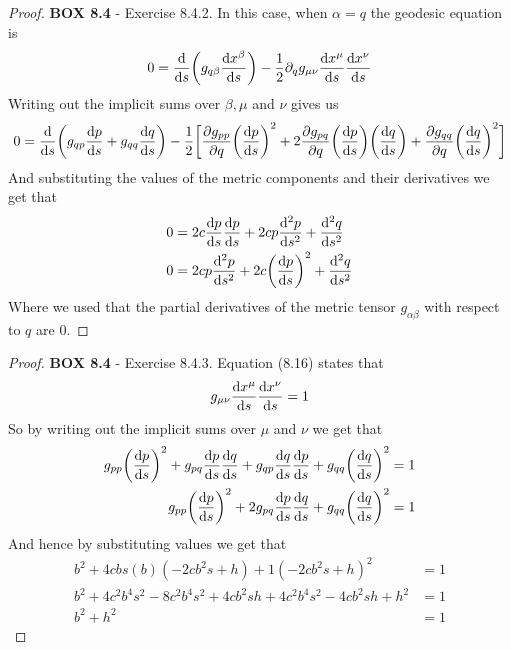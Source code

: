\documentclass[11pt]{article}
\theoremstyle{definition}
\begin{document}
\begin{proof}{\textbf{BOX 8.4} - Exercise 8.4.2.}
    In this case, when $\alpha = q$ the geodesic equation is
    \begin{align*}
        0 = \derivative{}{s}\bigg(
        g_{q\beta}\derivative{x^\beta}{s}\bigg)
        - \frac{1}{2}\partial_q g_{\mu\nu}\derivative{x^\mu}{s}
        \derivative{x^\nu}{s}
    \end{align*}
    Writing out the implicit sums over $\beta, \mu$ and $\nu$ gives us
    \begin{align*}
        0 = \derivative{}{s}\bigg(
            g_{qp}\derivative{p}{s} + g_{qq}\derivative{q}{s}
        \bigg)
        - \frac{1}{2}\bigg[
            \partialderivative{g_{pp}}{q} \bigg(\derivative{p}{s}\bigg)^2
            + 2 \partialderivative{g_{pq}}{q}\bigg(\derivative{p}{s}\bigg)
            \bigg(\derivative{q}{s}\bigg)
            + \partialderivative{g_{qq}}{q} \bigg(\derivative{q}{s}\bigg)^2
        \bigg]
    \end{align*}
    And substituting the values of the metric components and their derivatives
    we get that
    \begin{align*}
        0 &= 2c\derivative{p}{s}\derivative{p}{s} + 2cp\derivative[2]{p}{s}
            + \derivative[2]{q}{s}\\
        0 &= 2cp\derivative[2]{p}{s} + 2c\bigg(\derivative{p}{s}\bigg)^2
            + \derivative[2]{q}{s}
    \end{align*}
    Where we used that the partial derivatives of the metric tensor
    $g_{\alpha\beta}$ with respect to $q$ are 0.
\end{proof}
\begin{proof}{\textbf{BOX 8.4} - Exercise 8.4.3.}
    Equation (8.16) states that
    \begin{align*}
        g_{\mu\nu}\derivative{x^\mu}{s}\derivative{x^\nu}{s} = 1
    \end{align*}
    So by writing out the implicit sums over $\mu$ and $\nu$ we get that
    \begin{align*}
        g_{pp}\bigg(\derivative{p}{s}\bigg)^2
        + g_{pq}\derivative{p}{s}\derivative{q}{s}
        + g_{qp}\derivative{q}{s}\derivative{p}{s}
        + g_{qq}\bigg(\derivative{q}{s}\bigg)^2
        &= 1\\
        g_{pp}\bigg(\derivative{p}{s}\bigg)^2
        + 2g_{pq}\derivative{p}{s}\derivative{q}{s}
        + g_{qq}\bigg(\derivative{q}{s}\bigg)^2
        &= 1
    \end{align*}
    And hence by substituting values we get that
    \begin{align*}
        [1 + 4c^2(bs)^2]b^2 + 4cbs(b)(-2cb^2s + h) + 1(-2cb^2s + h)^2 &= 1\\
        b^2 + 4c^2b^4s^2 - 8c^2b^4s^2 + 4cb^2sh + 4c^2b^4s^2 - 4cb^2sh + h^2 &= 1\\
        b^2 + h^2 &= 1
    \end{align*}

\end{proof}
\end{document}
